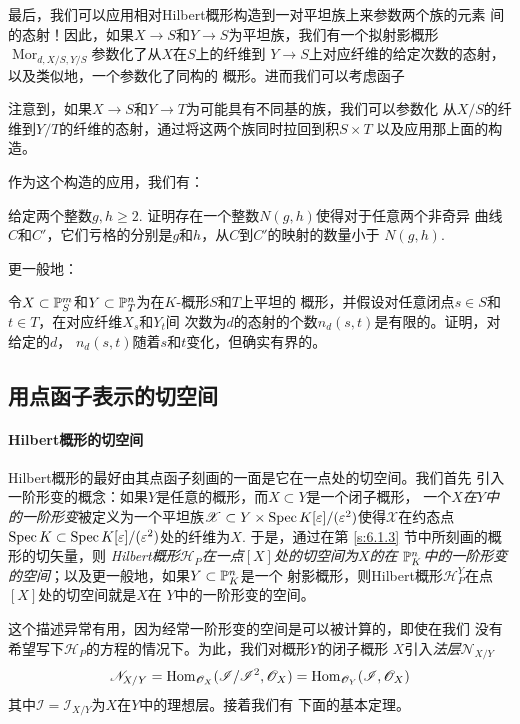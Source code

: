 最后，我们可以应用相对Hilbert概形构造到一对平坦族上来参数两个族的元素
间的态射！因此，如果$X\to S$和$Y\to S$为平坦族，我们有一个拟射影概形
$\operatorname{Mor}_{d,X/S,Y/S}$参数化了从$X$在$S$上的纤维到
$Y\to S$上对应纤维的给定次数的态射，以及类似地，一个参数化了同构的
概形。进而我们可以考虑函子

注意到，如果$X\to S$和$Y\to T$为可能具有不同基的族，我们可以参数化
从$X/S$的纤维到$Y/T$的纤维的态射，通过将这两个族同时拉回到积$S\times T$
以及应用那上面的构造。

作为这个构造的应用，我们有：

\begin{exe}\label{exe:6.27}
给定两个整数$g,h\geq 2$. 证明存在一个整数$N(g,h)$使得对于任意两个非奇异
曲线$C$和$C'$，它们亏格的分别是$g$和$h$，从$C$到$C'$的映射的数量小于
$N(g,h)$.
\end{exe}

更一般地：

\begin{exe}\label{exe:6.28}
    令$X\subset \P_S^m$和$Y\subset \P_T^n$为在$K$-概形$S$和$T$上平坦的
    概形，并假设对任意闭点$s\in S$和$t\in T$，在对应纤维$X_s$和$Y_t$间
    次数为$d$的态射的个数$n_d(s,t)$是有限的。证明，对给定的$d$，
    $n_d(s,t)$随着$s$和$t$变化，但确实有界的。
\end{exe}

\subsection{用点函子表示的切空间}\label{s:6.2.3}

\paragraph*{Hilbert概形的切空间}
Hilbert概形的最好由其点函子刻画的一面是它在一点处的切空间。我们首先
引入一阶形变的概念：如果$Y$是任意的概形，而$X\subset Y$是一个闭子概形，
一个\emph{$X$在$Y$中的一阶形变}被定义为一个平坦族$\mathscr X\subset 
Y\times \spec K[\varepsilon]/(\varepsilon^2)$使得$\mathscr X$在约态点
$\spec K\subset \spec K[\varepsilon]/(\varepsilon^2)$处的纤维为$X$.
于是，通过在第 \ref{s:6.1.3} 节中所刻画的概形的切矢量，则
\emph{Hilbert概形$\mathscr H_P$在一点$[X]$处的切空间为$X$的在
$\P_K^n$中的一阶形变的空间}；以及更一般地，如果$Y\subset \P_K^n$是一个
射影概形，则Hilbert概形$\mathscr H_P^Y$在点$[X]$处的切空间就是$X$在
$Y$中的一阶形变的空间。

这个描述异常有用，因为经常一阶形变的空间是可以被计算的，即使在我们
没有希望写下$\mathscr H_P$的方程的情况下。为此，我们对概形$Y$的闭子概形
$X$引入\emph{法层}$\mathscr N_{X/Y}$
\[
    \mathscr N_{X/Y}=\Hom_{\oo_X}(\mathscr I/\mathscr I^2,\oo_X)
    =\Hom_{\oo_Y}(\mathscr I,\oo_X)
\]
其中$\mathscr I=\mathscr I_{X/Y}$为$X$在$Y$中的理想层。接着我们有
下面的基本定理。

